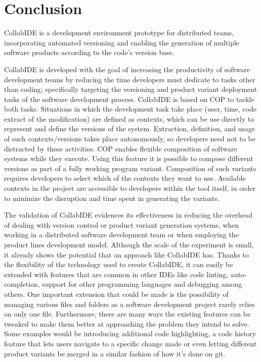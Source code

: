 
\section{Conclusion}
\label{sec:conclusion}

CollabIDE is a development environment prototype for distributed teams, incorporating automated 
versioning and enabling the generation of multiple software products according to the code's version
base.

CollabIDE is developed with the goal of increasing the productivity of software development teams by 
reducing the time developers must dedicate to tasks other than coding; specifically targeting the 
versioning and product variant deployment tasks of the software development process. CollabIDE is 
based on \ac{COP} to tackle both tasks. Situations in which the development task take place (\eg user, 
time, code extract of the modification) are defined as contexts, which can be use directly to represent 
and define the versions of the system. Extraction, definition, and usage of such contexts/versions takes 
place autonomously, so developers need not to be distracted by these activities. 
\ac{COP} enables flexible composition of software systems while they execute. Using this feature it is 
possible to compose different versions as part of a fully working program variant. Composition of such 
variants requires developers to select which of the contexts they want to use. Available contexts in the 
project are accessible to developers within the tool itself, in order to minimize the disruption and time 
spent in generating the variants.

The validation of CollabIDE evidences its effectiveness in reducing the overhead of dealing with version 
control or product variant generation systems, when working in a distributed software development team 
or when employing the product lines development model.
Although the scale of the experiment is small, it already shows the potential that an approach like 
CollabIDE has. Thanks to the flexibility of the technology used to create CollabIDE, it can easily be 
extended with features that are common in other IDEs like code linting, auto-completion, support for 
other programming languages and debugging among others. One important extension that could be 
made is the possibility of managing various files and folders as a software development project rarely 
relies on only one file. Furthermore, there are many ways the existing features can be tweaked to make 
them better at approaching the problem they intend to solve. Some examples would be introducing 
additional code highlighting, a code history feature that lets users navigate to a specific change made 
or even letting different product variants be merged in a similar fashion of how it’s done on git. 

